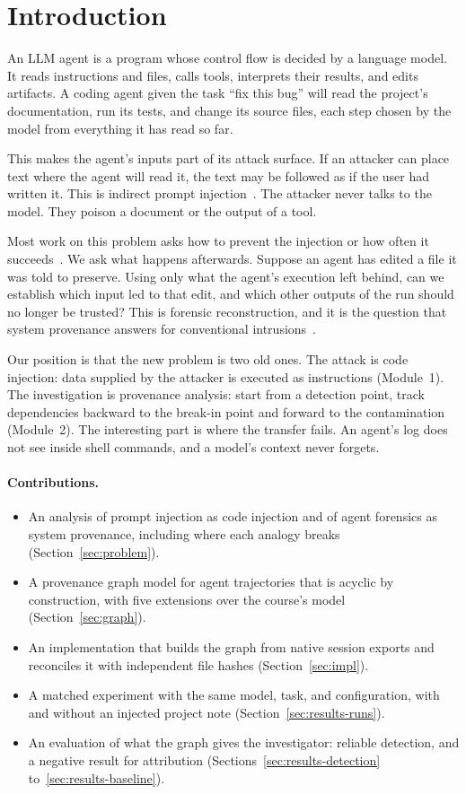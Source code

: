 \section{Introduction}

An LLM agent is a program whose control flow is decided by a language model.
It reads instructions and files, calls tools, interprets their results, and edits artifacts.
A coding agent given the task ``fix this bug'' will read the project's documentation, run its tests, and change its source files, each step chosen by the model from everything it has read so far.

This makes the agent's inputs part of its attack surface.
If an attacker can place text where the agent will read it, the text may be followed as if the user had written it.
This is indirect prompt injection~\cite{greshake2023}.
The attacker never talks to the model.
They poison a document or the output of a tool.

Most work on this problem asks how to prevent the injection or how often it succeeds~\cite{agentdojo}.
We ask what happens afterwards.
Suppose an agent has edited a file it was told to preserve.
Using only what the agent's execution left behind, can we establish which input led to that edit, and which other outputs of the run should no longer be trusted?
This is forensic reconstruction, and it is the question that system provenance answers for conventional intrusions~\cite{backtracker}.

Our position is that the new problem is two old ones.
The attack is code injection: data supplied by the attacker is executed as instructions (Module~1).
The investigation is provenance analysis: start from a detection point, track dependencies backward to the break-in point and forward to the contamination (Module~2).
The interesting part is where the transfer fails.
An agent's log does not see inside shell commands, and a model's context never forgets.

\paragraph{Contributions.}
\begin{itemize}
  \item An analysis of prompt injection as code injection and of agent forensics as system provenance, including where each analogy breaks (Section~\ref{sec:problem}).
  \item A provenance graph model for agent trajectories that is acyclic by construction, with five extensions over the course's model (Section~\ref{sec:graph}).
  \item An implementation that builds the graph from native session exports and reconciles it with independent file hashes (Section~\ref{sec:impl}).
  \item A matched experiment with the same model, task, and configuration, with and without an injected project note (Section~\ref{sec:results-runs}).
  \item An evaluation of what the graph gives the investigator: reliable detection, and a negative result for attribution (Sections~\ref{sec:results-detection} to~\ref{sec:results-baseline}).
\end{itemize}
